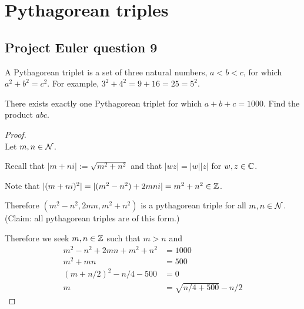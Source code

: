 \newpage
\section{Pythagorean triples}

\subsection*{Project Euler question 9}

\begin{mdframed}
  A Pythagorean triplet is a set of three natural numbers, $a < b < c$, for which
  $a^2 + b^2 = c^2$.  For example, $3^2 + 4^2 = 9 + 16 = 25 = 5^2$.

  There exists exactly one Pythagorean triplet for which $a + b + c = 1000$.  Find the product
  $abc$.
\end{mdframed}

\begin{proof}~\\
  Let $m, n \in \mathcal{N}$.

  Recall that $|m + ni| := \sqrt{m^2 + n^2}$ and that $|wz| = |w| |z|$ for $w, z \in \mathbb{C}$.

  Note that $|(m + ni)^2| = |(m^2 - n^2) + 2mni| = m^2 + n^2 \in \mathbb{Z}$.

  Therefore $(m^2 - n^2, 2mn, m^2 + n^2)$ is a pythagorean triple for all $m, n \in
  \mathcal{N}$. (Claim: all pythagorean triples are of this form.)

  Therefore we seek $m, n \in \mathbb{Z}$ such that $m > n$ and
  \begin{align*}
    m^2 - n^2 + 2mn + m^2 + n^2 &= 1000\\
    m^2 + mn                    &= 500\\
    (m + n/2)^2 - n/4 - 500     &= 0\\
    m                           &= \sqrt{n/4 + 500} - n/2
  \end{align*}

\end{proof}